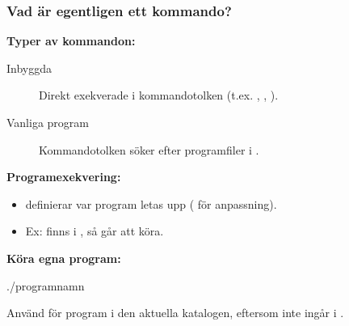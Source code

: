 




\begin{frame}[fragile=singleslide]
    \frametitle{Vad är egentligen ett kommando?}

    \textbf{Typer av kommandon:}
    \begin{description}
        \item[Inbyggda] Direkt exekverade i kommandotolken (t.ex. , , ).
        \item[Vanliga program] Kommandotolken söker efter programfiler i .
    \end{description}

    \textbf{Programexekvering:}
    \begin{itemize}
        \item {} definierar var program letas upp ( för anpassning).
        \item Ex:  finns i , så  går att köra.
    \end{itemize}

    \textbf{Köra egna program:}
    \begin{Code}
        ./programnamn
    \end{Code}
    Använd  för program i den aktuella katalogen, eftersom  inte ingår i .

\end{frame}


